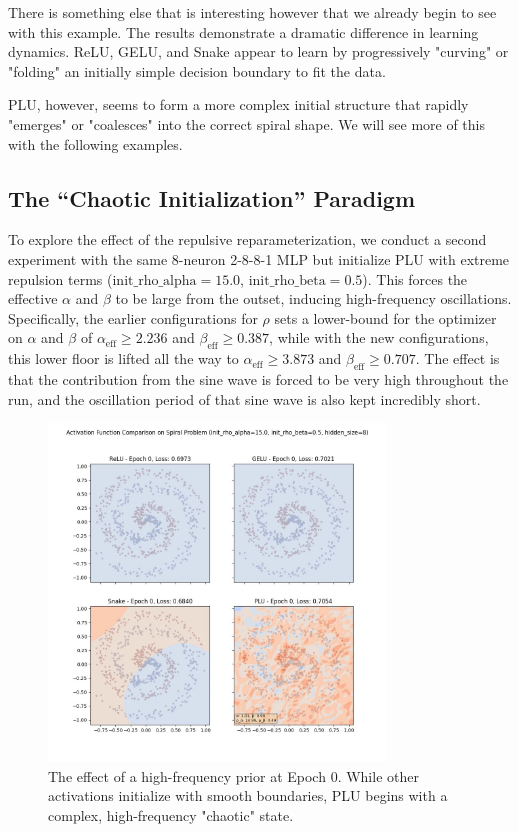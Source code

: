 \documentclass[11pt, letterpaper]{article}
\begin{document}
There is something else that is interesting however that we already begin to see with this example. The results demonstrate a dramatic difference in learning dynamics. ReLU, GELU, and Snake appear to learn by progressively "curving" or "folding" an initially simple decision boundary to fit the data.

PLU, however, seems to form a more complex initial structure that rapidly "emerges" or "coalesces" into the correct spiral shape. We will see more of this with the following examples.

\subsection{The ``Chaotic Initialization'' Paradigm}
\label{sec:chaotic_init}

To explore the effect of the repulsive reparameterization, we conduct a second experiment with the same 8-neuron 2-8-8-1 MLP but initialize PLU with extreme repulsion terms ($\text{init\_rho\_alpha}=15.0$, $\text{init\_rho\_beta}=0.5$). This forces the effective $\alpha$ and $\beta$ to be large from the outset, inducing high-frequency oscillations. Specifically, the earlier configurations for $\rho$ sets a lower-bound for the optimizer on $\alpha$ and $\beta$ of $\alpha_{\text{eff}} \ge 2.236$ and $\beta_{\text{eff}} \ge 0.387$, while with the new configurations, this lower floor is lifted all the way to $\alpha_{\text{eff}} \ge 3.873$ and $\beta_{\text{eff}} \ge 0.707$. The effect is that the contribution from the sine wave is forced to be very high throughout the run, and the oscillation period of that sine wave is also kept incredibly short.

\begin{figure}[H]
    \centering
    \includegraphics[width=0.8\textwidth]{Examples/spiral_activation_comparison_hidden_neurons_8_sin_pushed_extreme_epoch_0.jpg}
    \caption{The effect of a high-frequency prior at Epoch 0. While other activations initialize with smooth boundaries, PLU begins with a complex, high-frequency "chaotic" state.}
    \label{fig:chaotic_init}
\end{figure}
\end{document}
